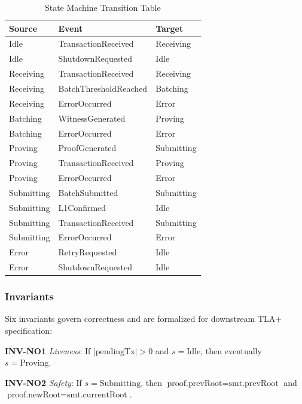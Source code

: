 \begin{table}[htbp]
\centering
\caption{State Machine Transition Table}
\label{tab:transitions}
\begin{tabular}{lll}
\toprule
\textbf{Source} & \textbf{Event} & \textbf{Target} \\
\midrule
Idle       & TransactionReceived   & Receiving \\
Idle       & ShutdownRequested     & Idle \\
\midrule
Receiving  & TransactionReceived   & Receiving \\
Receiving  & BatchThresholdReached & Batching \\
Receiving  & ErrorOccurred         & Error \\
\midrule
Batching   & WitnessGenerated      & Proving \\
Batching   & ErrorOccurred         & Error \\
\midrule
Proving    & ProofGenerated        & Submitting \\
Proving    & TransactionReceived   & Proving \\
Proving    & ErrorOccurred         & Error \\
\midrule
Submitting & BatchSubmitted        & Submitting \\
Submitting & L1Confirmed           & Idle \\
Submitting & TransactionReceived   & Submitting \\
Submitting & ErrorOccurred         & Error \\
\midrule
Error      & RetryRequested        & Idle \\
Error      & ShutdownRequested     & Idle \\
\bottomrule
\end{tabular}
\end{table}

\subsubsection{Invariants}

Six invariants govern correctness and are formalized for downstream
TLA+ specification:

\noindent\textbf{INV-NO1} \emph{Liveness}: If $|\text{pendingTx}| > 0$ and
$s = \text{Idle}$, then eventually $s = \text{Proving}$.

\smallskip\noindent\textbf{INV-NO2} \emph{Safety}: If $s = \text{Submitting}$, then
$\text{proof.prevRoot} = \text{smt.prevRoot}$ and
$\text{proof.newRoot} = \text{smt.currentRoot}$.

